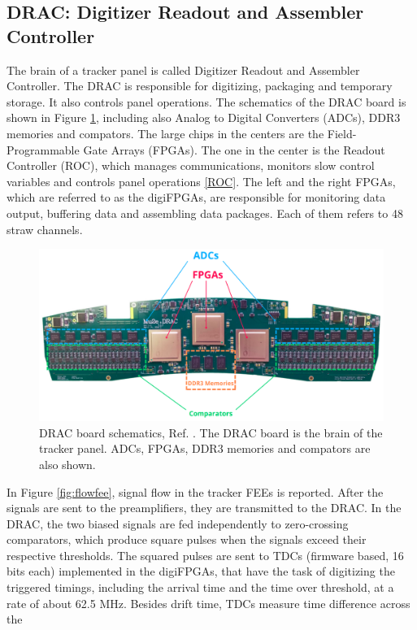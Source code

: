 \subsection{DRAC: Digitizer Readout and Assembler Controller}\label{DRAC}
The brain of a tracker panel is called Digitizer Readout and Assembler Controller. 
The DRAC is responsible for digitizing, packaging and temporary storage. It also controls 
panel operations. The schematics of the DRAC board is shown in Figure \ref{fig:drac}, including also 
Analog to Digital Converters (ADCs), DDR3 memories and compators. 
The large chips in the centers are the Field-Programmable Gate Arrays (FPGAs). The one 
in the center is the Readout Controller (ROC), which manages communications, monitors 
slow control variables and controls panel operations \ref{ROC}. The left and the right 
FPGAs, which are referred to as the digiFPGAs, are responsible for monitoring data output, 
buffering data and assembling data packages. Each of them refers to 48 straw channels. 
\begin{figure}[!h]
\centering
\includegraphics[width =\textwidth]{figures/png/Screenshot_20240204_115052.png}
\caption{DRAC board schematics, Ref. \cite{drac}. 
The DRAC board is the brain of the tracker panel. ADCs, FPGAs, DDR3 memories and compators are also shown.}
\label{fig:drac}
\end{figure}
In Figure \ref{fig:flowfee}, signal flow in the tracker FEEs is reported.
After the signals are sent to the preamplifiers, they are transmitted to the DRAC.
In the DRAC, the two biased signals are fed independently to 
zero-crossing comparators, which produce square pulses when the signals exceed 
their respective thresholds. The squared pulses are sent to TDCs 
(firmware based, 16 bits each) implemented in the digiFPGAs, that have the task 
of digitizing the triggered timings, including the arrival time and the time over threshold, 
at a rate of about 62.5 MHz. Besides drift time, TDCs measure time difference across the 
